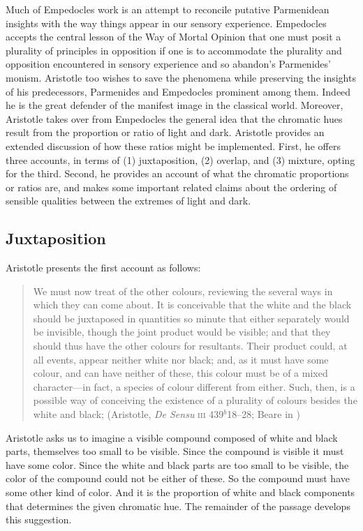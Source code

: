 Much of Empedocles work is an attempt to reconcile putative Parmenidean insights with the way things appear in our sensory experience. Empedocles accepts the central lesson of the Way of Mortal Opinion that one must posit a plurality of principles in opposition if one is to accommodate the plurality and opposition encountered in sensory experience and so abandon's Parmenides' monism. Aristotle too wishes to save the phenomena while preserving the insights of his predecessors, Parmenides and Empedocles prominent among them. Indeed he is the great defender of the manifest image in the classical world. Moreover, Aristotle takes over from Empedocles the general idea that the chromatic hues result from the proportion or ratio of light and dark. Aristotle provides an extended discussion of how these ratios might be implemented. First, he offers three accounts, in terms of (1) juxtaposition, (2) overlap, and (3) mixture, opting for the third. Second, he provides an account of what the chromatic proportions or ratios are, and makes some important related claims about the ordering of sensible qualities between the extremes of light and dark.

\subsection{Juxtaposition} %
\label{sub:juxtaposition}

Aristotle presents the first account as follows:
\begin{quote}
	We must now treat of the other colours, reviewing the several ways in which they can come about. It is conceivable that the white and the black should be juxtaposed in quantities so minute that either separately would be invisible, though the joint product would be visible; and that they should thus have the other colours for resultants. Their product could, at all events, appear neither white nor black; and, as it must have some colour, and can have neither of these, this colour must be of a mixed character---in fact, a species of colour different from either. Such, then, is a possible way of conceiving the existence of a plurality of colours besides the white and black; (Aristotle, \emph{De Sensu} \textsc{iii} 439\( ^{b} \)18--28; Beare in \citealt[8]{Barnes:1984uq})
\end{quote}
Aristotle asks us to imagine a visible compound composed of white and black parts, themselves too small to be visible. Since the compound is visible it must have some color. Since the white and black parts are too small to be visible, the color of the compound could not be either of these. So the compound must have some other kind of color. And it is the proportion of white and black components that determines the given chromatic hue. The remainder of the passage develops this suggestion. 

